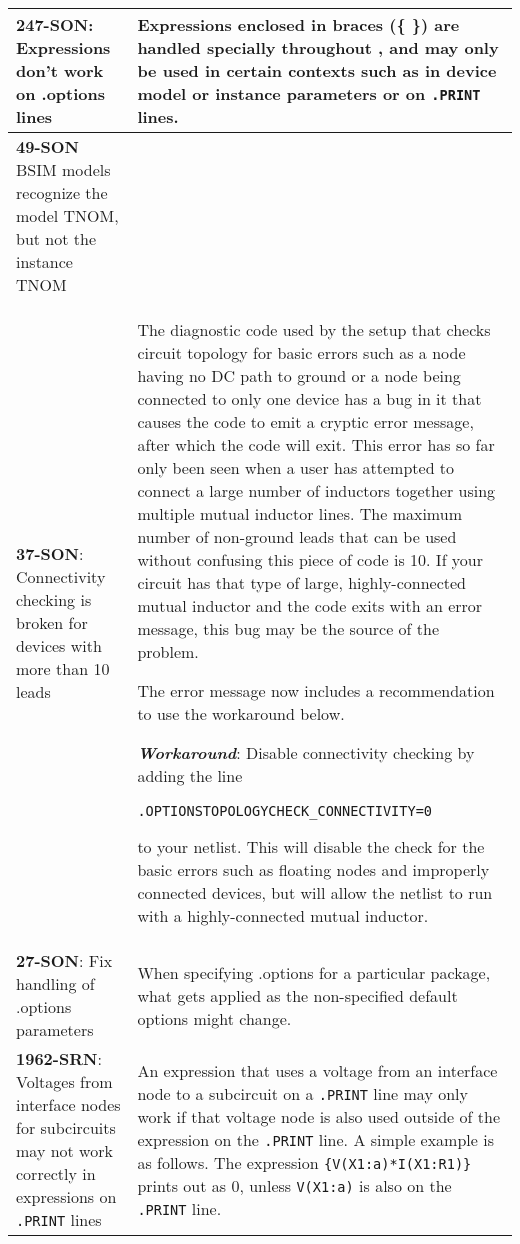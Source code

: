 {\begin{longtable}[h] {>{\raggedright\small}m{2in}|>{\raggedright\let\\\tabularnewline\small}m{3.5in}}
\textbf{247-SON}: Expressions don't work on .options lines & Expressions enclosed
in braces (\{ \}) are handled specially throughout \Xyce{}, and may only be used
in certain contexts such as in device model or instance parameters or on
\texttt{.PRINT} lines.
\\ \hline


\textbf{49-SON} \Xyce{} BSIM models recognize the model TNOM, but not the
instance TNOM & 
\\ \hline

\textbf{37-SON}: Connectivity checking is broken for devices with more than 10
leads & The diagnostic code used by the \Xyce{} setup that checks circuit
topology for basic errors such as a node having no DC path to ground or a node
being connected to only one device has a bug in it that causes the code to emit
a cryptic error message, after which the code will exit.  This error has so far
only been seen when a user has attempted to connect a large number of inductors
together using multiple mutual inductor lines.  The maximum number of
non-ground leads that can be used without confusing this piece of code is 10.
If your circuit has that type of large, highly-connected mutual inductor and
the code exits with an error message, this bug may be the source of the problem.

The error message now includes a recommendation to use the workaround below.

\textbf{\textit{Workaround}}: Disable connectivity checking by adding the line

\begin{alltt} .OPTIONS TOPOLOGY CHECK_CONNECTIVITY=0 \end{alltt}

to your netlist.  This will disable the check for the basic errors such as
floating nodes and improperly connected devices, but will allow the netlist to
run with a highly-connected mutual inductor.
\\ \hline


\textbf{27-SON}: Fix handling of .options parameters & When specifying .options
  for a particular package, what gets applied as the non-specified default
  options might change.  \\ \hline

\textbf{1962-SRN}: Voltages from interface nodes for subcircuits may not work
correctly in expressions on \texttt{.PRINT} lines & An expression that uses a 
voltage from an interface node to a subcircuit on a \texttt{.PRINT} line 
may only work if that voltage node is also used outside of the expression on 
the \texttt{.PRINT} line.  A simple example is as follows.  The expression 
\texttt{\{V(X1:a)*I(X1:R1)\}} prints out as 0, unless \texttt{V(X1:a)} is also on 
the \texttt{.PRINT} line.
\\ \hline


\end{longtable}}
